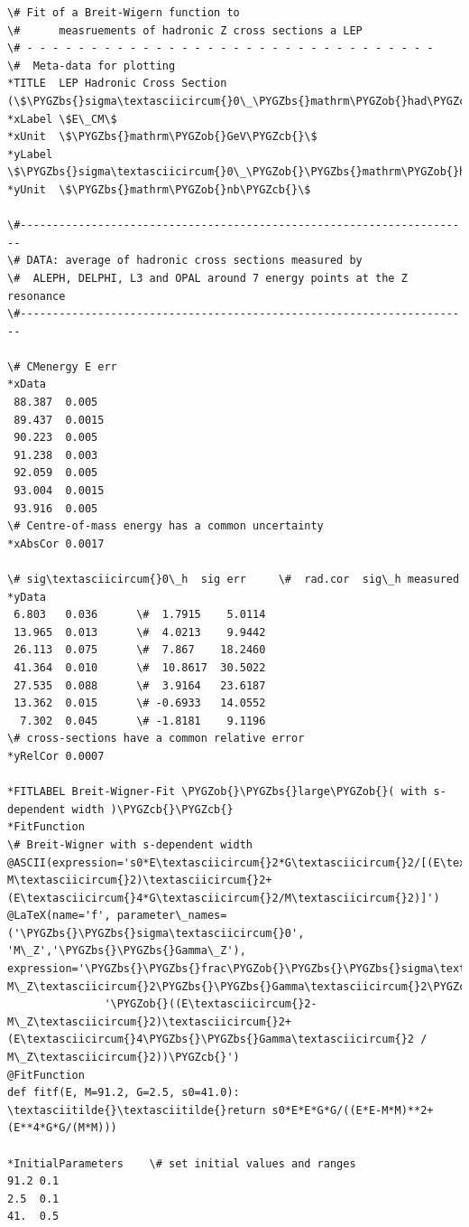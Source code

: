 \documentclass[a4paper,10pt,english]{sphinxmanual}
\def\PYGZbs{\char`\\}
\def\PYGZob{\char`\{}
\def\PYGZcb{\char`\}}
\begin{document}
\begin{Verbatim}[commandchars=\\\{\}]
\# Fit of a Breit-Wigern function to
\#      measruements of hadronic Z cross sections a LEP
\# - - - - - - - - - - - - - - - - - - - - - - - - - - - - - - - -
\#  Meta-data for plotting
*TITLE  LEP Hadronic Cross Section (\$\PYGZbs{}sigma\textasciicircum{}0\_\PYGZbs{}mathrm\PYGZob{}had\PYGZcb{}\$)
*xLabel \$E\_CM\$
*xUnit  \$\PYGZbs{}mathrm\PYGZob{}GeV\PYGZcb{}\$
*yLabel \$\PYGZbs{}sigma\textasciicircum{}0\_\PYGZob{}\PYGZbs{}mathrm\PYGZob{}had\PYGZcb{}\PYGZcb{}\$
*yUnit  \$\PYGZbs{}mathrm\PYGZob{}nb\PYGZcb{}\$

\#----------------------------------------------------------------------
\# DATA: average of hadronic cross sections measured by
\#  ALEPH, DELPHI, L3 and OPAL around 7 energy points at the Z resonance
\#----------------------------------------------------------------------

\# CMenergy E err
*xData
 88.387  0.005
 89.437  0.0015
 90.223  0.005
 91.238  0.003
 92.059  0.005
 93.004  0.0015
 93.916  0.005
\# Centre-of-mass energy has a common uncertainty
*xAbsCor 0.0017

\# sig\textasciicircum{}0\_h  sig err     \#  rad.cor  sig\_h measured
*yData
 6.803   0.036      \#  1.7915    5.0114
 13.965  0.013      \#  4.0213    9.9442
 26.113  0.075      \#  7.867    18.2460
 41.364  0.010      \#  10.8617  30.5022
 27.535  0.088      \#  3.9164   23.6187
 13.362  0.015      \# -0.6933   14.0552
  7.302  0.045      \# -1.8181    9.1196
\# cross-sections have a common relative error
*yRelCor 0.0007

*FITLABEL Breit-Wigner-Fit \PYGZob{}\PYGZbs{}large\PYGZob{}( with s-dependent width )\PYGZcb{}\PYGZcb{}
*FitFunction
\# Breit-Wigner with s-dependent width
@ASCII(expression='s0*E\textasciicircum{}2*G\textasciicircum{}2/[(E\textasciicircum{}2-M\textasciicircum{}2)\textasciicircum{}2+(E\textasciicircum{}4*G\textasciicircum{}2/M\textasciicircum{}2)]')
@LaTeX(name='f', parameter\_names=('\PYGZbs{}\PYGZbs{}sigma\textasciicircum{}0', 'M\_Z','\PYGZbs{}\PYGZbs{}Gamma\_Z'),
expression='\PYGZbs{}\PYGZbs{}frac\PYGZob{}\PYGZbs{}\PYGZbs{}sigma\textasciicircum{}0\PYGZbs{}\PYGZbs{}, M\_Z\textasciicircum{}2\PYGZbs{}\PYGZbs{}Gamma\textasciicircum{}2\PYGZcb{}'
               '\PYGZob{}((E\textasciicircum{}2-M\_Z\textasciicircum{}2)\textasciicircum{}2+(E\textasciicircum{}4\PYGZbs{}\PYGZbs{}Gamma\textasciicircum{}2 / M\_Z\textasciicircum{}2))\PYGZcb{}')
@FitFunction
def fitf(E, M=91.2, G=2.5, s0=41.0):
\textasciitilde{}\textasciitilde{}return s0*E*E*G*G/((E*E-M*M)**2+(E**4*G*G/(M*M)))

*InitialParameters    \# set initial values and ranges
91.2 0.1
2.5  0.1
41.  0.5
\end{Verbatim}
\end{document}

